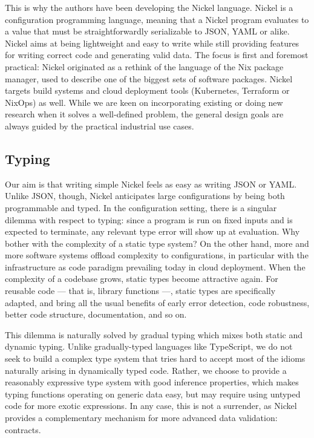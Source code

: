 \documentclass{article}
\begin{document}
This is why the authors have been developing the Nickel
language\cite{NickelRepo}. Nickel is a configuration programming language,
meaning that a Nickel program evaluates to a value that must be
straightforwardly serializable to JSON, YAML or alike. Nickel aims at being
lightweight and easy to write while still providing features for writing correct
code and generating valid data. The focus is first and foremost practical:
Nickel originated as a rethink of the language of the Nix package manager, used
to describe one of the biggest sets of software packages\cite{repology}.  Nickel
targets build systems and cloud deployment tools (Kubernetes, Terraform or
NixOps) as well. While we are keen on incorporating existing or doing new
research when it solves a well-defined problem, the general design goals are
always guided by the practical industrial use cases.

\subsection{Typing}

Our aim is that writing simple Nickel feels as easy as writing JSON or YAML.
Unlike JSON, though, Nickel anticipates large configurations by being both
programmable and typed. In the configuration setting, there is a singular
dilemma with respect to typing: since a program is run on fixed inputs and is
expected to terminate, any relevant type error will show up at evaluation.  Why
bother with the complexity of a static type system? On the other hand, more and
more software systems offload complexity to configurations, in particular with
the infrastructure as code paradigm prevailing today in cloud deployment. When
the complexity of a codebase grows, static types become attractive again.  For
reusable code — that is, library functions —, static types are specifically
adapted, and bring all the usual benefits of early error detection, code
robustness, better code structure, documentation, and so on.

This dilemma is naturally solved by gradual typing\cite{Siek06gradualtyping}
which mixes both static and dynamic typing. Unlike gradually-typed languages
like TypeScript, we do not seek to build a complex type system that tries hard
to accept most of the idioms naturally arising in dynamically typed code.
Rather, we choose to provide a reasonably expressive type system with good
inference properties, which makes typing functions operating on generic data easy,
but may require using untyped code for more exotic expressions.  In any case,
this is not a surrender, as Nickel provides a complementary mechanism for more
advanced data validation: contracts.
\end{document}
